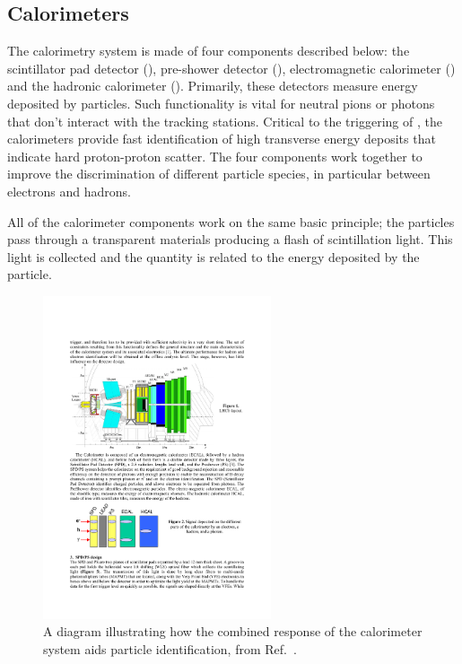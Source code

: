 \subsection{Calorimeters}

The calorimetry system is made of four components described below: the scintillator pad detector (\spd), pre-shower detector (\presh), electromagnetic calorimeter (\ecal) and the hadronic calorimeter (\hcal).
Primarily, these detectors measure energy deposited by particles. Such functionality is vital for neutral pions or photons that don't interact with the tracking stations. Critical to the triggering of \lhcb, the calorimeters provide fast identification of high transverse energy deposits that indicate hard proton-proton scatter. The four components work together to improve the discrimination of different particle species, in particular between electrons and hadrons. 



All of the calorimeter components work on the same basic principle; the particles pass through a transparent materials producing a flash of scintillation light. This light is collected and the quantity is related to the energy deposited by the particle.  



\begin{figure}[!h]
    \centering
    \includegraphics[width=0.6\textwidth]{figs/Detector/calo_layout.pdf}
    \caption{A diagram illustrating how the combined response of the calorimeter system aids particle identification, from Ref.~\cite{1742-6596-293-1-012059}.}
    \label{fig:Dec_calo_layout}   
\end{figure}



